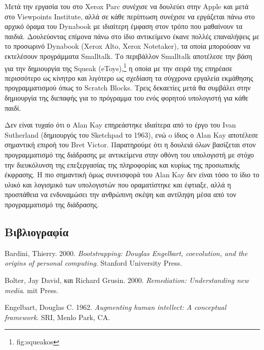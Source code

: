 \documentclass[
]{article}
\newlength{\cslhangindent}
\newlength{\cslentryspacingunit} %
\newenvironment{CSLReferences}[2] %
 {%
  \setlength{\parindent}{0pt}
  \ifodd #1
  \let\oldpar\par
  \def\par{\hangindent=\cslhangindent\oldpar}
  \fi
  \setlength{\parskip}{#2\cslentryspacingunit}
 }%
 {}
\begin{document}
Μετά την εργασία του στο Xerox Parc συνέχισε να δουλεύει στην Apple και
μετά στο Viewpoints Institute, αλλά σε κάθε περίπτωση συνέχισε να
εργάζεται πάνω στο αρχικό όραμα του Dynabook με ιδιαίτερη έμφαση στον
τρόπο που μαθαίνουν τα παιδιά. Δουλεύοντας επίμονα πάνω στο ίδιο
αντικείμενο έκανε πολλές επαναλήψεις με το προσωρινό Dynabook (Xerox
Alto, Xerox Notetaker), τα οποία μπορούσαν να εκτελέσουν προγράμματα
Smalltalk. Το περιβάλλον Smalltalk αποτέλεσε την βάση για την δημιουργία
της Squeak (eToys),\footnote{fig:squeakos} η οποία με την σειρά της
επηρέασε περισσότερο ως κίνητρο και λιγότερο ως σχεδίαση τα σύγχρονα
εργαλεία εκμάθησης προγραμματισμού όπως το Scratch Blocks. Τρεις
δεκαετίες μετά θα συμβάλει στην δημιουργία της διεπαφής για το πρόγραμμα
του ενός φορητού υπολογιστή για κάθε παιδί.

Δεν είναι τυχαίο ότι ο Alan Kay επηρεάστηκε ιδιαίτερα από το έργο του
Ivan Sutherland (δημιουργός του Sketchpad το 1963), ενώ o ίδιος ο Alan
Kay αποτέλεσε σημαντική επιροή του Bret Victor. Παρατηρούμε ότι η
δουλειά όλων βασίζεται στον προγραμματισμό της διάδρασης με αντικείμενα
στην οθόνη του υπολογιστή με στόχο την διευκόλυνση της επεξεργασίας της
πληροφορίας και κυρίως της προσωπικής έκφρασης. Η πιο σημαντική όμως
συνεισφορά του Alan Kay δεν είναι τόσο το ίδιο το υλικό και λογισμικό
των υπολογιστών που οραματίστηκε και έφτιαξε, αλλά η προσπάθεια να
ενδυναμώσει την ανθρώπινη σκέψη και αντίληψη μέσα από τον προγραμματισμό
της διάδρασης.

\hypertarget{ux3b2ux3b9ux3b2ux3bbux3b9ux3bfux3b3ux3c1ux3b1ux3c6ux3afux3b1}{%
\subsection*{Βιβλιογραφία}\label{ux3b2ux3b9ux3b2ux3bbux3b9ux3bfux3b3ux3c1ux3b1ux3c6ux3afux3b1}}

\hypertarget{refs}{}
\begin{CSLReferences}{0}{0}
\end{CSLReferences}

Bardini, Thierry. 2000. \emph{Bootstrapping: Douglas Engelbart,
coevolution, and the origins of personal computing}. Stanford University
Press.

Bolter, Jay David, και Richard Grusin. 2000. \emph{Remediation:
Understanding new media}. mit Press.

Engelbart, Douglas C. 1962. \emph{Augmenting human intellect: A
conceptual framework}. SRI, Menlo Park, CA.
\end{document}
